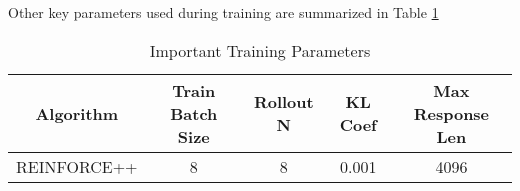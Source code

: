 

Other key parameters used during training are summarized in Table \ref{tab:training_parameters}

\begin{table}[h!]
    \centering
    \caption{Important Training Parameters}
    \label{tab:training_parameters}
    \begin{tabular}{ccccc}
        \toprule
        \textbf{Algorithm} & \textbf{Train Batch Size} & \textbf{Rollout N} & \textbf{KL Coef} & \textbf{Max Response Len} \\
        \midrule
        REINFORCE++ & 8 & 8 & 0.001 & 4096 \\
        \bottomrule
    \end{tabular}
\end{table}

